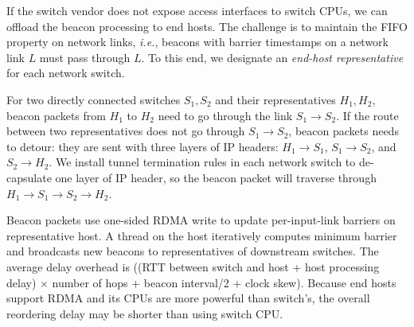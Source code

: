 If the switch vendor does not expose access interfaces to switch CPUs, we can offload the beacon processing to end hosts. The challenge is to maintain the FIFO property on network links, \emph{i.e.}, beacons with barrier timestamps on a network link $L$ must pass through $L$. To this end, we designate an \emph{end-host representative} for each network switch. %

For two directly connected switches $S_1, S_2$ and their representatives $H_1, H_2$, beacon packets from $H_1$ to $H_2$ need to go through the link $S_1 \rightarrow S_2$. If the route between two representatives does not go through $S_1 \rightarrow S_2$, beacon packets needs to detour: they are sent with three layers of IP headers: $H_1 \rightarrow S_1$, $S_1 \rightarrow S_2$, and $S_2 \rightarrow H_2$.
We install tunnel termination rules in each network switch to de-capsulate one layer of IP header, so the beacon packet will traverse through $H_1 \rightarrow S_1 \rightarrow S_2 \rightarrow H_2$.

Beacon packets use one-sided RDMA write to update per-input-link barriers on representative host. A thread on the host iteratively computes minimum barrier and broadcasts new beacons to representatives of downstream switches.
The average delay overhead is ((RTT between switch and host + host processing delay) $\times$ number of hops + beacon interval/2 + clock skew). Because end hosts support RDMA and its CPUs are more powerful than switch's, the overall reordering delay may be shorter than using switch CPU.
